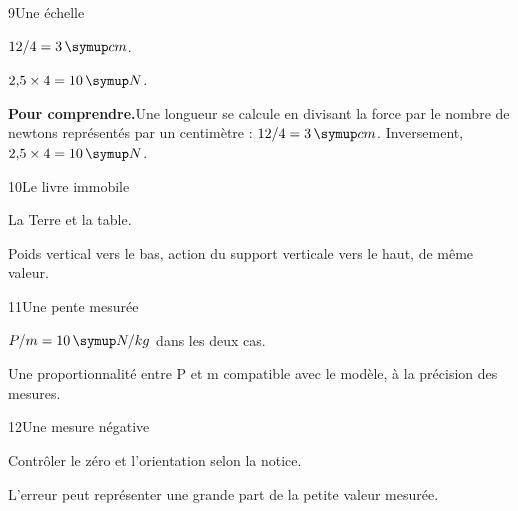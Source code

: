 \par\noindent\begin{minipage}{\linewidth}
\begin{corrige}{9}{Une échelle}
\begin{questions}
\item $12/4=3\unite{cm}$.
\item $2{,}5\times4=10\unite N$.
\end{questions}
\par\smallskip\noindent\textbf{Pour comprendre.}\enspace Une longueur se calcule en divisant la force par le nombre de newtons représentés par un centimètre : $12/4=3\unite{cm}$. Inversement, $2{,}5\times4=10\unite N$.\par
{}
\end{corrige}
\end{minipage}
\par\noindent\begin{minipage}{\linewidth}
\begin{corrige}{10}{Le livre immobile}
\begin{questions}
\item La Terre et la table.
\item Poids vertical vers le bas, action du support verticale vers le haut, de même valeur.
\end{questions}
\end{corrige}
\end{minipage}
\par\noindent\begin{minipage}{\linewidth}
\begin{corrige}{11}{Une pente mesurée}
\begin{questions}
\item $P/m=10\unite{N/kg}$ dans les deux cas.
\item Une proportionnalité entre P et m compatible avec le modèle, à la précision des mesures.
\end{questions}
\end{corrige}
\end{minipage}
\par\noindent\begin{minipage}{\linewidth}
\begin{corrige}{12}{Une mesure négative}
\begin{questions}
\item Contrôler le zéro et l’orientation selon la notice.
\item L’erreur peut représenter une grande part de la petite valeur mesurée.
\end{questions}
\end{corrige}
\end{minipage}
